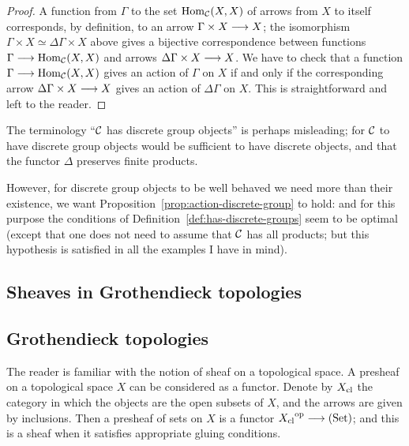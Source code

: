 \begin{2   CONTRAVARIANT FUNCTORS}
\begin{2.2 Group objects}
\begin{proof}
A function from $\Gamma$ to the set $\operatorname{Hom}_{\mathcal{C}}(X, X)$ of arrows from $X$ to itself corresponds, by definition, to an arrow $\Gamma \times X \arr X$; the isomorphism $\Gamma \times X \simeq \Delta\Gamma \times X$ above gives a bijective correspondence between functions $\Gamma \arr \hom_{\cC}(X, X)$ and arrows $\Delta\Gamma \times X \arr X$. We have to check that a function $\Gamma \arr \hom_{\cC}(X, X)$ gives an action of $\Gamma$ on $X$ if and only if the corresponding arrow $\Delta\Gamma \times X \arr X$ gives an action of $\Delta\Gamma$ on $X$. This is straightforward and left to the reader. 
\end{proof}

\begin{remark}
The terminology ``$\mathcal{C}$ has discrete group objects'' is perhaps misleading; for $\mathcal{C}$ to have discrete group objects would be sufficient to have discrete objects, and that the functor $\Delta$ preserves finite products.

However, for discrete group objects to be well behaved we need more than their existence, we want Proposition~\ref{prop:action-discrete-group} to hold: and for this purpose the conditions of Definition~\ref{def:has-discrete-groups} seem to be optimal (except that one does not need to assume that $\mathcal{C}$ has all products; but this hypothesis is satisfied in all the examples I have in mind).
\end{remark}

\end{2.2 Group objects}
\begin{2.3 Sheaves in Grothendieck topologies}
\setcounter{section}{2}
\section{Sheaves in Grothendieck topologies}\label{sec:sheaves}
\setcounter{theorem}{23}
\subsection{Grothendieck topologies}

The reader is familiar with the notion of sheaf on a topological space. A presheaf on a topological space $X$ can be considered as a functor. Denote by $X_\mathrm{cl}$ the category in which the objects are the open subsets of $X$, and the arrows are given by inclusions. Then a presheaf of sets on $X$ is a functor ${X\cl}\op \arr \catset$; and this is a sheaf when it satisfies appropriate gluing conditions. 


\end{2.3 Sheaves in Grothendieck topologies}
\end{2   CONTRAVARIANT FUNCTORS}
